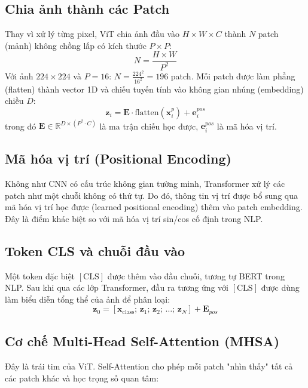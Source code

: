 \documentclass[13pt,a4paper]{extreport}
\begin{document}
\subsection{Chia ảnh thành các Patch}
Thay vì xử lý từng pixel, ViT chia ảnh đầu vào $H \times W \times C$ thành $N$ patch (mảnh) không chồng lấp có kích thước $P \times P$:
\begin{equation}
    N = \frac{H \times W}{P^2}
    \label{eq:num_patches}
\end{equation}
Với ảnh $224 \times 224$ và $P = 16$: $N = \frac{224^2}{16^2} = 196$ patch. Mỗi patch được làm phẳng (flatten) thành vector 1D và chiếu tuyến tính vào không gian nhúng (embedding) chiều $D$:
\begin{equation}
    \mathbf{z}_i = \mathbf{E} \cdot \text{flatten}(\mathbf{x}_i^p) + \mathbf{e}_i^{pos}
    \label{eq:patch_embed}
\end{equation}
trong đó $\mathbf{E} \in \mathbb{R}^{D \times (P^2 \cdot C)}$ là ma trận chiếu học được, $\mathbf{e}_i^{pos}$ là mã hóa vị trí.

\subsection{Mã hóa vị trí (Positional Encoding)}
Không như CNN có cấu trúc không gian tường minh, Transformer xử lý các patch như một chuỗi không có thứ tự. Do đó, thông tin vị trí được bổ sung qua mã hóa vị trí học được (learned positional encoding) thêm vào patch embedding. Đây là điểm khác biệt so với mã hóa vị trí sin/cos cố định trong NLP.

\subsection{Token CLS và chuỗi đầu vào}
Một token đặc biệt $[\text{CLS}]$ được thêm vào đầu chuỗi, tương tự BERT trong NLP. Sau khi qua các lớp Transformer, đầu ra tương ứng với $[\text{CLS}]$ được dùng làm biểu diễn tổng thể của ảnh để phân loại:
\begin{equation}
    \mathbf{z}_0 = [\mathbf{x}_\text{class};\, \mathbf{z}_1;\, \mathbf{z}_2;\, \ldots;\, \mathbf{z}_N] + \mathbf{E}_{pos}
    \label{eq:cls_token}
\end{equation}

\subsection{Cơ chế Multi-Head Self-Attention (MHSA)}
Đây là trái tim của ViT. Self-Attention cho phép mỗi patch "nhìn thấy" tất cả các patch khác và học trọng số quan tâm:
\end{document}
